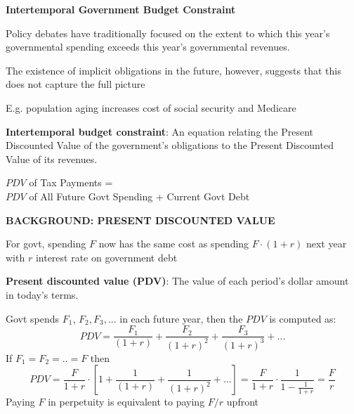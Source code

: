 \documentclass[landscape]{slides}
\begin{document}
\begin{slide}
\begin{center}
{\bf Intertemporal Government Budget Constraint}
\end{center}

Policy debates have traditionally focused on the extent to which this year's governmental spending exceeds this year's governmental revenues.

The existence of implicit obligations in the future, however, suggests that this does not capture the full picture

E.g. population aging increases cost of social security and Medicare

{\bf Intertemporal budget constraint}:
An equation relating the Present Discounted Value of the government's obligations to the Present Discounted Value of its revenues.

$PDV$ of Tax Payments  = \\ $PDV$ of All Future Govt Spending + Current Govt Debt
\end{slide}


\begin{slide}
\begin{center}
{\bf BACKGROUND: PRESENT DISCOUNTED VALUE}
\end{center}
For govt, spending $F$ now has the same cost as spending $F \cdot (1+r)$ next year with $r$ interest rate on
government debt

{\bf Present discounted value (PDV)}:
The value of each period's dollar amount in today's terms.

Govt spends $F_1$, $F_2, F_3,...$  in each future year, then the $PDV$ is computed as:
\[PDV=\frac{F_1}{(1+r)}+\frac{F_2}{(1+r)^2}+\frac{F_3}{(1+r)^3}+...\]
If $F_1=F_2=.. =F$ then
\[PDV = \frac{F}{1+r} \cdot \left [1+\frac{1}{(1+r)}+\frac{1}{(1+r)^2} + ... \right ] = \frac{F}{1+r} \cdot \frac{1}{1-\frac{1}{1+r}}
=\frac{F}{r} \]
Paying $F$ in perpetuity is equivalent to paying $F/r$ upfront
\end{slide}
\end{document}
